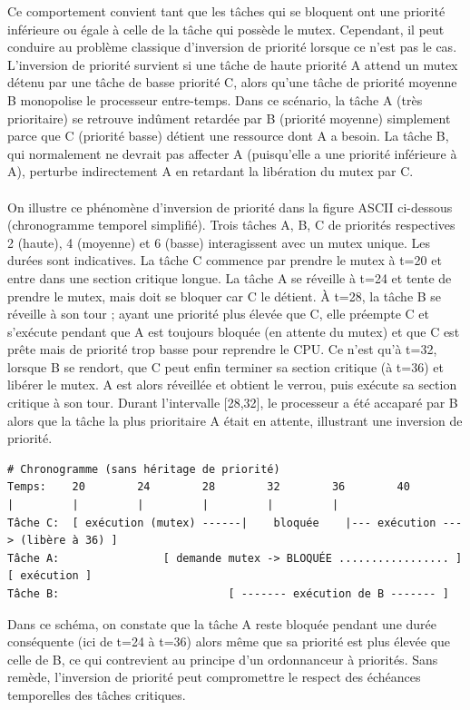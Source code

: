 \documentclass{latexPackage/utc-report/utc-report}
\begin{document}
Ce comportement convient tant que les tâches qui se bloquent ont une priorité inférieure ou égale à celle de la tâche qui possède le mutex. Cependant, il peut conduire au problème classique d’inversion de priorité lorsque ce n’est pas le cas. L’inversion de priorité survient si une tâche de haute priorité A attend un mutex détenu par une tâche de basse priorité C, alors qu’une tâche de priorité moyenne B monopolise le processeur entre-temps. Dans ce scénario, la tâche A (très prioritaire) se retrouve indûment retardée par B (priorité moyenne) simplement parce que C (priorité basse) détient une ressource dont A a besoin. La tâche B, qui normalement ne devrait pas affecter A (puisqu’elle a une priorité inférieure à A), perturbe indirectement A en retardant la libération du mutex par C.
\\\\
On illustre ce phénomène d’inversion de priorité dans la figure ASCII ci-dessous (chronogramme temporel simplifié). Trois tâches A, B, C de priorités respectives 2 (haute), 4 (moyenne) et 6 (basse) interagissent avec un mutex unique. Les durées sont indicatives. La tâche C commence par prendre le mutex à t=20 et entre dans une section critique longue. La tâche A se réveille à t=24 et tente de prendre le mutex, mais doit se bloquer car C le détient. À t=28, la tâche B se réveille à son tour ; ayant une priorité plus élevée que C, elle préempte C et s’exécute pendant que A est toujours bloquée (en attente du mutex) et que C est prête mais de priorité trop basse pour reprendre le CPU. Ce n’est qu’à t=32, lorsque B se rendort, que C peut enfin terminer sa section critique (à t=36) et libérer le mutex. A est alors réveillée et obtient le verrou, puis exécute sa section critique à son tour. Durant l’intervalle [28,32], le processeur a été accaparé par B alors que la tâche la plus prioritaire A était en attente, illustrant une inversion de priorité.

\begin{verbatim}
# Chronogramme (sans héritage de priorité)
Temps:    20        24        28        32        36        40
|         |         |         |         |         |
Tâche C:  [ exécution (mutex) ------|    bloquée    |--- exécution ---> (libère à 36) ]
Tâche A:                [ demande mutex -> BLOQUÉE ................. ]   [ exécution ]
Tâche B:                          [ ------- exécution de B ------- ]
\end{verbatim}

Dans ce schéma, on constate que la tâche A reste bloquée pendant une durée conséquente (ici de t=24 à t=36) alors même que sa priorité est plus élevée que celle de B, ce qui contrevient au principe d’un ordonnanceur à priorités. Sans remède, l’inversion de priorité peut compromettre le respect des échéances temporelles des tâches critiques.
\end{document}
